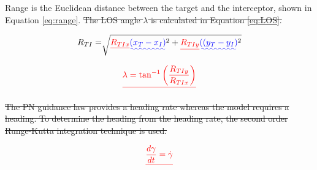 \documentclass[conference]{IEEEtran}
\providecommand{\DIFadd}[1]{{\protect\color{blue}\uwave{#1}}} %
\providecommand{\DIFdel}[1]{{\protect\color{red}\sout{#1}}}                      %
\providecommand{\DIFaddbegin}{} %
\providecommand{\DIFaddend}{} %
\providecommand{\DIFdelbegin}{} %
\providecommand{\DIFdelend}{} %
\newcommand{\DIFscaledelfig}{0.5}
\newlength{\DIFdelgraphicswidth} %
\newlength{\DIFdelgraphicsheight} %
\newcommand{\DIFaddincludegraphics}[2][]{{\color{blue}\fbox{\DIFOincludegraphics[#1]{#2}}}} %
\newcommand{\DIFdelincludegraphics}[2][]{%
\sbox{\DIFdelgraphicsbox}{\DIFOincludegraphics[#1]{#2}}%
\settoboxwidth{\DIFdelgraphicswidth}{\DIFdelgraphicsbox} %
\settoboxtotalheight{\DIFdelgraphicsheight}{\DIFdelgraphicsbox} %
\scalebox{\DIFscaledelfig}{%
\parbox[b]{\DIFdelgraphicswidth}{\usebox{\DIFdelgraphicsbox}\\[-\baselineskip] \rule{\DIFdelgraphicswidth}{0em}}\llap{\resizebox{\DIFdelgraphicswidth}{\DIFdelgraphicsheight}{%
\setlength{\unitlength}{\DIFdelgraphicswidth}%
\begin{picture}(1,1)%
\thicklines\linethickness{2pt} %
{\color[rgb]{1,0,0}\put(0,0){\framebox(1,1){}}}%
{\color[rgb]{1,0,0}\put(0,0){\line( 1,1){1}}}%
{\color[rgb]{1,0,0}\put(0,1){\line(1,-1){1}}}%
\end{picture}%
}\hspace*{3pt}}} %
} %
\DeclareRobustCommand{\DIFaddbegin}{\DIFOaddbegin \let\includegraphics\DIFaddincludegraphics} %
\DeclareRobustCommand{\DIFaddend}{\DIFOaddend \let\includegraphics\DIFOincludegraphics} %
\DeclareRobustCommand{\DIFdelbegin}{\DIFOdelbegin \let\includegraphics\DIFdelincludegraphics} %
\DeclareRobustCommand{\DIFdelend}{\DIFOaddend \let\includegraphics\DIFOincludegraphics} %
\begin{document}
\DIFaddend Range is the Euclidean distance between the target and the interceptor, shown in Equation \ref{eq:range}. 
\DIFdelbegin \DIFdel{The LOS angle $\lambda$ is calculated in Equation \ref{eq:LOS}. 
}\DIFdelend 

\begin{equation} \label{eq:range}
R_{TI} =\sqrt[]{\DIFdelbegin \DIFdel{R_{TIx}}\DIFdelend \DIFaddbegin \DIFadd{(x_T - x_I)}\DIFaddend ^2+\DIFdelbegin \DIFdel{R_{TIy}}\DIFdelend \DIFaddbegin \DIFadd{((y_T - y_I)}\DIFaddend ^2}
\end{equation}



\DIFdelbegin \begin{displaymath} \DIFdel{%
\lambda = \tan^{-1} \left(\frac{R_{TIy}}{R_{TIx}}\right)
}\end{displaymath}
\DIFdelend %

\DIFdelbegin \DIFdel{The PN guidance law provides a heading rate whereas the model requires a heading. To determine the heading from the heading rate, the second order Runge-Kutta integration technique is used. 
}\DIFdelend %

\DIFdelbegin \begin{displaymath} \DIFdel{%
\frac{d\gamma}{dt} = \dot{\gamma}
}\end{displaymath}

\DIFdelend %
\end{document}

